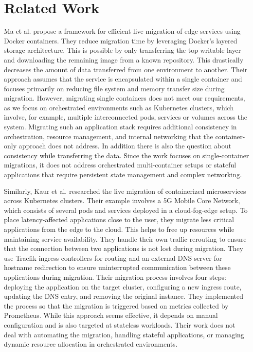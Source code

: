 %
\section{Related Work}
\label{sec:related-work}
%
Ma et al. \cite{ma_efficient_2019} propose a framework for efficient live migration of edge services using Docker containers.
They reduce migration time by leveraging Docker's layered storage architecture.
This is possible by only transferring the top writable layer and downloading the remaining image from a known repository. This drastically decreases the amount of data transferred from one environment to another.
Their approach assumes that the service is encapsulated within a single container and focuses primarily on reducing file system and memory transfer size during migration.
However, migrating single containers does not meet our requirements, as we focus on orchestrated environments such as Kubernetes clusters, which involve, for example, multiple interconnected pods, services or volumes across the system.
Migrating such an application stack requires additional consistency in orchestration, resource management, and internal networking that the container-only approach does not address.
In addition there is also the question about consistency while transferring the data.
Since the work focuses on single-container migrations, it does not address orchestrated multi-container setups or stateful applications that require persistent state management and complex networking.

Similarly, Kaur et al. \cite{kaur_live_2023} researched the live migration of containerized microservices across Kubernetes clusters. Their example involves a 5G Mobile Core Network, which consists of several pods and services deployed in a cloud-fog-edge setup. To place latency-affected applications close to the user, they migrate less critical applications from the edge to the cloud. This helps to free up resources while maintaining service availability. They handle their own traffic rerouting to ensure that the connection between two applications is not lost during migration. They use Traefik ingress controllers for routing and an external DNS server for hostname redirection to ensure uninterrupted communication between these applications during migration. Their migration process involves four steps: deploying the application on the target cluster, configuring a new ingress route, updating the DNS entry, and removing the original instance. They implemented the process so that the migration is triggered based on metrics collected by Prometheus. While this approach seems effective, it depends on manual configuration and is also targeted at stateless workloads. Their work does not deal with automating the migration, handling stateful applications, or managing dynamic resource allocation in orchestrated environments.

